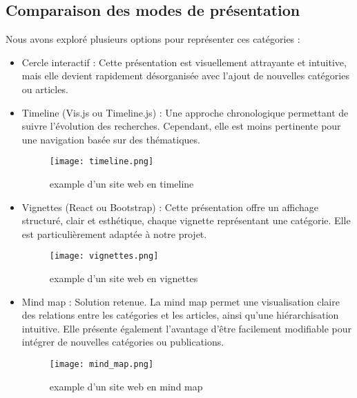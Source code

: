 \documentclass{article}
\begin{document}
\subsection{Comparaison des modes de présentation}
Nous avons exploré plusieurs options pour représenter ces catégories :

\begin{itemize}
    \item Cercle interactif : Cette présentation est visuellement attrayante et intuitive, mais elle devient rapidement désorganisée avec l’ajout de nouvelles catégories ou articles.
    
    \item Timeline (Vis.js ou Timeline.js) : Une approche chronologique permettant de suivre l'évolution des recherches. Cependant, elle est moins pertinente pour une navigation basée sur des thématiques.

    \begin{figure}[H]
    \centering
    \texttt{[image: timeline.png]}
    \caption{example d'un site web en timeline}
    \label{fig:timeline.png}
    \end{figure}
    
    \item Vignettes (React ou Bootstrap) : Cette présentation offre un affichage structuré, clair et esthétique, chaque vignette représentant une catégorie. Elle est particulièrement adaptée à notre projet.
    
    \begin{figure}[H]
    \centering
    \texttt{[image: vignettes.png]}
    \caption{example d'un site web en vignettes}
    \label{fig:vignettes.png}
    \end{figure}
    
    \item Mind map : Solution retenue. La mind map permet une visualisation claire des relations entre les catégories et les articles, ainsi qu’une hiérarchisation intuitive. Elle présente également l’avantage d’être facilement modifiable pour intégrer de nouvelles catégories ou publications.

    \begin{figure}[H]
    \centering
    \texttt{[image: mind\_map.png]}
    \caption{example d'un site web en mind map}
    \label{fig:mind_map.png}
    \end{figure}
\end{itemize}
\end{document}
